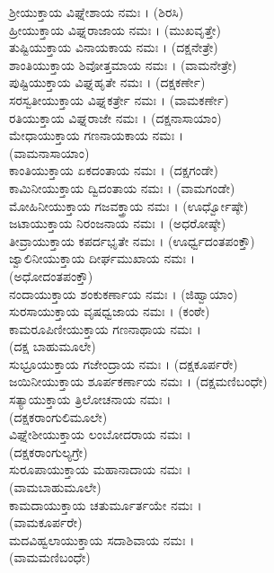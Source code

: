  ಶ್ರೀಯುಕ್ತಾಯ ವಿಘ್ನೇಶಾಯ ನಮಃ । (ಶಿರಸಿ)\\
 ಹ್ರೀಯುಕ್ತಾಯ ವಿಘ್ನರಾಜಾಯ ನಮಃ । (ಮುಖವೃತ್ತೇ)\\
 ತುಷ್ಟಿಯುಕ್ತಾಯ ವಿನಾಯಕಾಯ ನಮಃ । (ದಕ್ಷನೇತ್ರೇ)\\
 ಶಾಂತಿಯುಕ್ತಾಯ ಶಿವೋತ್ತಮಾಯ ನಮಃ । (ವಾಮನೇತ್ರೇ)\\
 ಪುಷ್ಟಿಯುಕ್ತಾಯ ವಿಘ್ನಹೃತೇ ನಮಃ । (ದಕ್ಷಕರ್ಣೇ)\\
 ಸರಸ್ವತೀಯುಕ್ತಾಯ ವಿಘ್ನಕರ್ತ್ರೇ ನಮಃ । (ವಾಮಕರ್ಣೇ)\\
 ರತಿಯುಕ್ತಾಯ ವಿಘ್ನರಾಜೇ ನಮಃ । (ದಕ್ಷನಾಸಾಯಾಂ)\\
 ಮೇಧಾಯುಕ್ತಾಯ ಗಣನಾಯಕಾಯ ನಮಃ ।\\(ವಾಮನಾಸಾಯಾಂ)\\
 ಕಾಂತಿಯುಕ್ತಾಯ ಏಕದಂತಾಯ ನಮಃ । (ದಕ್ಷಗಂಡೇ)\\
 ಕಾಮಿನೀಯುಕ್ತಾಯ ದ್ವಿದಂತಾಯ ನಮಃ । (ವಾಮಗಂಡೇ)\\
 ಮೋಹಿನೀಯುಕ್ತಾಯ ಗಜವಕ್ತ್ರಾಯ ನಮಃ । (ಊರ್ಧ್ವೋಷ್ಠೇ)\\
 ಜಟಾಯುಕ್ತಾಯ ನಿರಂಜನಾಯ ನಮಃ । (ಅಧರೋಷ್ಠೇ)\\
 ತೀವ್ರಾಯುಕ್ತಾಯ ಕಪರ್ದಭೃತೇ ನಮಃ । (ಊರ್ಧ್ವದಂತಪಂಕ್ತೌ)\\
 ಜ್ವಾಲಿನೀಯುಕ್ತಾಯ ದೀರ್ಘಮುಖಾಯ ನಮಃ । \\(ಅಧೋದಂತಪಂಕ್ತೌ)\\
 ನಂದಾಯುಕ್ತಾಯ ಶಂಕುಕರ್ಣಾಯ ನಮಃ । (ಜಿಹ್ವಾಯಾಂ)\\
 ಸುರಸಾಯುಕ್ತಾಯ ವೃಷಧ್ವಜಾಯ ನಮಃ । (ಕಂಠೇ)\\
 ಕಾಮರೂಪಿಣೀಯುಕ್ತಾಯ ಗಣನಾಥಾಯ ನಮಃ । \\(ದಕ್ಷ ಬಾಹುಮೂಲೇ)\\
 ಸುಭ್ರೂಯುಕ್ತಾಯ ಗಜೇಂದ್ರಾಯ ನಮಃ । (ದಕ್ಷಕೂರ್ಪರೇ)\\
 ಜಯಿನೀಯುಕ್ತಾಯ ಶೂರ್ಪಕರ್ಣಾಯ ನಮಃ । (ದಕ್ಷಮಣಿಬಂಧೇ)\\
 ಸತ್ಯಾಯುಕ್ತಾಯ ತ್ರಿಲೋಚನಾಯ ನಮಃ । \\(ದಕ್ಷಕರಾಂಗುಲಿಮೂಲೇ)\\
 ವಿಘ್ನೇಶೀಯುಕ್ತಾಯ ಲಂಬೋದರಾಯ ನಮಃ ।\\ (ದಕ್ಷಕರಾಂಗುಲ್ಯಗ್ರೇ)\\
 ಸುರೂಪಾಯುಕ್ತಾಯ ಮಹಾನಾದಾಯ ನಮಃ ।\\ (ವಾಮಬಾಹುಮೂಲೇ)\\
 ಕಾಮದಾಯುಕ್ತಾಯ ಚತುರ್ಮೂರ್ತಯೇ ನಮಃ ।\\ (ವಾಮಕೂರ್ಪರೇ)\\
 ಮದವಿಹ್ವಲಾಯುಕ್ತಾಯ ಸದಾಶಿವಾಯ ನಮಃ ।\\ (ವಾಮಮಣಿಬಂಧೇ)\\
